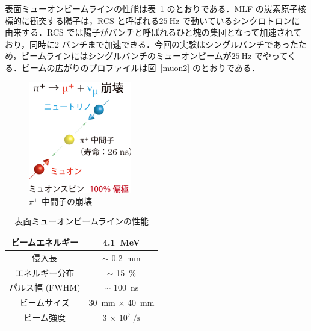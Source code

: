 表面ミューオンビームラインの性能は表~\ref{muon1} のとおりである．MLF の炭素原子核標的に衝突する陽子は，RCS と呼ばれる$25~\mathrm{Hz}$ で動いているシンクロトロンに由来する．RCS では陽子がバンチと呼ばれるひと塊の集団となって加速されており，同時に2 バンチまで加速できる．今回の実験はシングルバンチであったため，ビームラインにはシングルバンチのミューオンビームが$25~\mathrm{Hz}$ でやってくる．ビームの広がりのプロファイルは図~\ref{muon2} のとおりである．

\begin{figure}[H]
\centering
\includegraphics[width=0.4\textwidth]{figure/hayakawa/decay_pion.png}
\caption{$\pi^{+}$ 中間子の崩壊\cite{aboutmuon}}
\end{figure}

\begin{table}[H]
\caption{表面ミューオンビームラインの性能}
\label{muon1}
\centering
\begin{tabular}{cc}\toprule
ビームエネルギー & 4.1~MeV \\ \midrule
侵入長 & $\sim$ 0.2~mm \\ \midrule
エネルギー分布 & $\sim$ 15~\% \\ \midrule
パルス幅 (FWHM) & $\sim$ 100~ns \\ \midrule
ビームサイズ & 30~mm $\times$ 40~mm \\ \midrule
ビーム強度 & 3 $\times$ $10^7~/\mathrm{s}$ \\  \bottomrule
\end{tabular}
\end{table}
   
